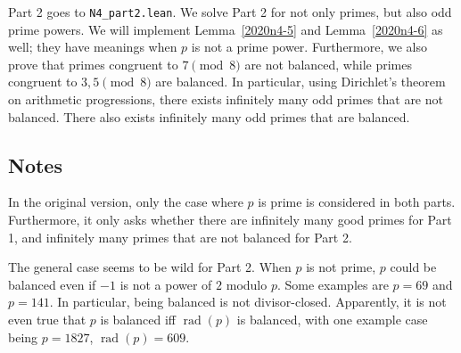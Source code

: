 \documentclass{article}
\DeclareMathOperator*{\rad}{rad}
\begin{document}
Part 2 goes to \texttt{N4\_part2.lean}.
We solve Part 2 for not only primes, but also odd prime powers.
We will implement Lemma~\ref{2020n4-5} and Lemma~\ref{2020n4-6} as well; they have meanings when $p$ is not a prime power.
Furthermore, we also prove that primes congruent to $7 \pmod{8}$ are not balanced, while primes congruent to $3, 5 \pmod{8}$ are balanced.
In particular, using Dirichlet's theorem on arithmetic progressions, there exists infinitely many odd primes that are not balanced.
There also exists infinitely many odd primes that are balanced.



\subsection*{Notes}

In the original version, only the case where $p$ is prime is considered in both parts.
Furthermore, it only asks whether there are infinitely many good primes for Part 1, and infinitely many primes that are not balanced for Part 2.

The general case seems to be wild for Part 2.
When $p$ is not prime, $p$ could be balanced even if $-1$ is not a power of $2$ modulo $p$.
Some examples are $p = 69$ and $p = 141$.
In particular, being balanced is not divisor-closed.
Apparently, it is not even true that $p$ is balanced iff $\rad(p)$ is balanced, with one example case being $p = 1827$, $\rad(p) = 609$.
\end{document}
